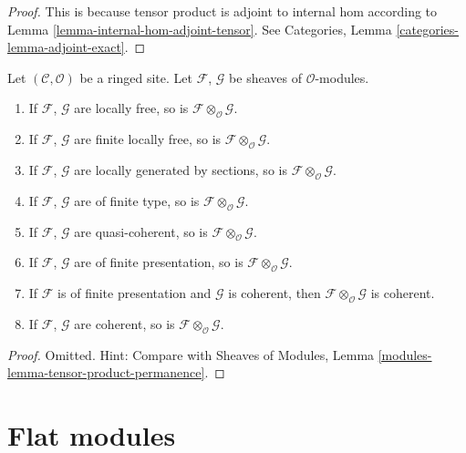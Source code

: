 \begin{proof}
This is because tensor product is adjoint to internal hom according
to Lemma \ref{lemma-internal-hom-adjoint-tensor}.
See Categories, Lemma \ref{categories-lemma-adjoint-exact}.
\end{proof}

\begin{lemma}
\label{lemma-tensor-product-permanence}
Let $(\mathcal{C}, \mathcal{O})$ be a ringed site.
Let $\mathcal{F}$, $\mathcal{G}$ be sheaves of $\mathcal{O}$-modules.
\begin{enumerate}
\item If $\mathcal{F}$, $\mathcal{G}$ are locally free,
so is $\mathcal{F} \otimes_\mathcal{O} \mathcal{G}$.
\item If $\mathcal{F}$, $\mathcal{G}$ are finite locally free,
so is $\mathcal{F} \otimes_\mathcal{O} \mathcal{G}$.
\item If $\mathcal{F}$, $\mathcal{G}$ are locally generated
by sections, so is $\mathcal{F}\otimes_\mathcal{O} \mathcal{G}$.
\item If $\mathcal{F}$, $\mathcal{G}$ are of finite type,
so is $\mathcal{F} \otimes_\mathcal{O} \mathcal{G}$.
\item If $\mathcal{F}$, $\mathcal{G}$ are quasi-coherent,
so is $\mathcal{F} \otimes_\mathcal{O} \mathcal{G}$.
\item If $\mathcal{F}$, $\mathcal{G}$ are of finite presentation,
so is $\mathcal{F} \otimes_\mathcal{O} \mathcal{G}$.
\item If $\mathcal{F}$ is of finite presentation and $\mathcal{G}$ is coherent,
then $\mathcal{F} \otimes_\mathcal{O} \mathcal{G}$ is coherent.
\item If $\mathcal{F}$, $\mathcal{G}$ are coherent,
so is $\mathcal{F} \otimes_\mathcal{O} \mathcal{G}$.
\end{enumerate}
\end{lemma}

\begin{proof}
Omitted. Hint: Compare with
Sheaves of Modules, Lemma \ref{modules-lemma-tensor-product-permanence}.
\end{proof}









\section{Flat modules}
\label{section-flat}

